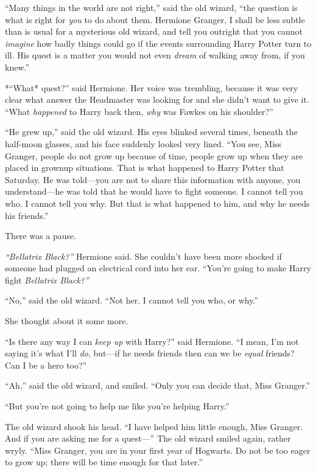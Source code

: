 ``Many things in the world are not right,'' said the old wizard, ``the
question is what is right for \emph{you} to do about them. Hermione
Granger, I shall be less subtle than is usual for a mysterious old
wizard, and tell you outright that you cannot \emph{imagine} how badly
things could go if the events surrounding Harry Potter turn to ill. His
quest is a matter you would not even \emph{dream} of walking away from,
if you knew.''

*``What* quest?'' said Hermione. Her voice was trembling, because it was
very clear what answer the Headmaster was looking for and she didn't
want to give it. ``What \emph{happened} to Harry back then, \emph{why}
was Fawkes on his shoulder?''

``He grew up,'' said the old wizard. His eyes blinked several times,
beneath the half-moon glasses, and his face suddenly looked very lined.
``You see, Miss Granger, people do not grow up because of time, people
grow up when they are placed in grownup situations. That is what
happened to Harry Potter that Saturday. He was told---you are not to
share this information with anyone, you understand---he was told that he
would have to fight someone. I cannot tell you who. I cannot tell you
why. But that is what happened to him, and why he needs his friends.''

There was a pause.

\emph{``Bellatrix Black?''} Hermione said. She couldn't have been more
shocked if someone had plugged an electrical cord into her ear. ``You're
going to make Harry fight \emph{Bellatrix Black?''}

``No,'' said the old wizard. ``Not her. I cannot tell you who, or why.''

She thought about it some more.

``Is there any way I can \emph{keep up} with Harry?'' said Hermione. ``I
mean, I'm not saying it's what I'll \emph{do}, but---if he needs friends
then can we be \emph{equal} friends? Can I be a hero too?''

``Ah,'' said the old wizard, and smiled. ``Only you can decide that,
Miss Granger.''

``But you're not going to help me like you're helping Harry.''

The old wizard shook his head. ``I have helped him little enough, Miss
Granger. And if you are asking me for a quest---'' The old wizard smiled
again, rather wryly. ``Miss Granger, you are in your first year of
Hogwarts. Do not be too eager to grow up; there will be time enough for
that later.''

